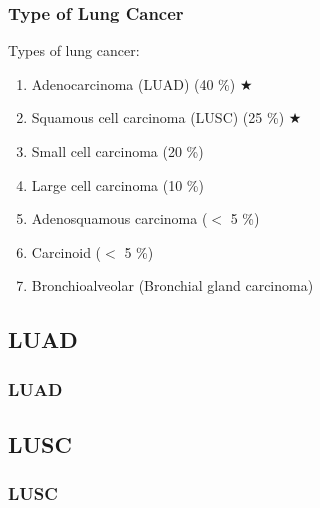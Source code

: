 \documentclass{beamer}
\begin{document}
    \begin{frame}
        \frametitle{Type of Lung Cancer}

        Types of lung cancer:
        \begin{enumerate}
            \item Adenocarcinoma (LUAD) (40 \%) $\bigstar$
            \item Squamous cell carcinoma (LUSC) (25 \%) $\bigstar$
            \item Small cell carcinoma (20 \%)
            \item Large cell carcinoma (10 \%)
            \item Adenosquamous carcinoma ($<$ 5 \%)
            \item Carcinoid ($<$ 5 \%)
            \item Bronchioalveolar (Bronchial gland carcinoma)
        \end{enumerate}
        \cite{lung1, lung2}
    \end{frame}

    \subsection{LUAD}
    \begin{frame}
        \frametitle{LUAD}
    \end{frame}

    \subsection{LUSC}
    \begin{frame}
        \frametitle{LUSC}
    \end{frame}
\end{document}
